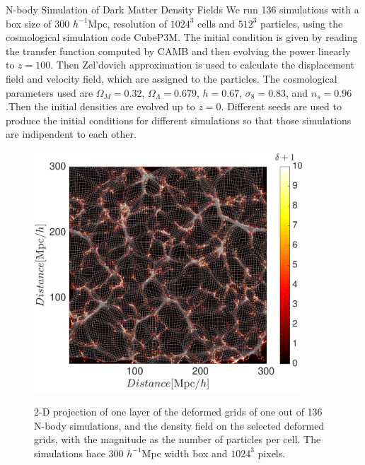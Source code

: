 \begin{section}{N-body Simulation of Dark Matter Density Fields}
  \label{sec:simulation}
    We run 136 simulations with a box size of 300 $h^{-1}$Mpc, 
resolution of $1024^3$ cells and $512^3$ particles, using the cosmological 
simulation code CubeP3M\cite{bib:Harnois2013}. The initial condition is 
given by reading the transfer function computed by CAMB \cite{bib:Lewis2000} 
and then evolving the power linearly to $z=100$. Then Zel'dovich approximation 
is used to calculate the displacement field and velocity field, which are 
assigned to the particles. The cosmological parameters used are $\Omega_M=0.32$, 
$\Omega_{\Lambda}=0.679$, $h=0.67$, $\sigma_8=0.83$, and $n_s=0.96$.Then the 
initial densities are evolved up to $z=0$. Different seeds are used to produce 
the initial conditions for different simulations so that those simulations are 
indipendent to each other.
\begin{figure}[t!]
\centering
 \includegraphics[width=0.9\textwidth]{sar_best_analysis-crop.pdf}
 \label{fig:simandrec}
   \caption{
2-D projection of one
layer of the deformed grids of one out of 136 N-body simulations, and the density field 
on the selected deformed grids, with the magnitude as the number of particles per cell. 
The simulations hace 300 $h^{-1}$Mpc width box and $1024^3$ pixels.}
\end{figure}

\end{section}

